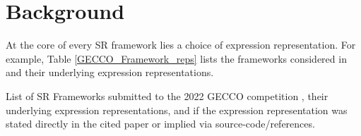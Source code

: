 \documentclass[runningheads]{llncs}
\begin{document}
 

\section{Background}\label{sec:Background}
At the core of every SR framework lies a choice of expression representation. For example, Table \ref {GECCO_Framework_reps} lists the frameworks considered in \cite{defranca2023interpretable} and their underlying expression representations. 

\begin{table}
\caption{\label{GECCO_Framework_reps}List of SR Frameworks submitted to the 2022 GECCO competition \cite{defranca2023interpretable}, their underlying expression representations, and if the expression representation was stated directly in the cited paper or implied via source-code/references.}



\end{table}
\end{document}
